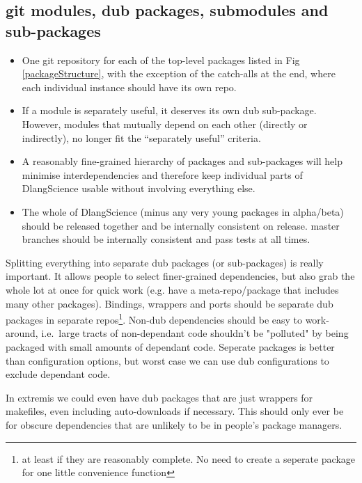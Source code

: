 \documentclass[10pt,a5paper,DIV=13]{scrartcl}
\begin{document}
\subsection{git modules, dub packages, submodules and sub-packages}
\begin{itemize}
    \item One git repository for each of the top-level packages listed in Fig \ref{packageStructure}, with the exception of the catch-alls at the end, where each individual instance should have its own repo.
    \item If a module is separately useful, it deserves its own dub sub-package. However, modules that mutually depend on each other (directly or indirectly), no longer fit the ``separately useful'' criteria.
    \item A reasonably fine-grained hierarchy of packages and sub-packages will help minimise interdependencies and therefore keep individual parts of DlangScience usable without involving everything else.
    \item The whole of DlangScience (minus any very young packages in alpha/beta) should be released together and be internally consistent on release. master branches should be internally consistent and pass tests at all times.
\end{itemize}

Splitting everything into separate dub packages (or sub-packages) is really important. It allows people to select finer-grained dependencies, but also grab the whole lot at once for quick work (e.g. have a meta-repo/package that includes many other packages). Bindings, wrappers and ports should be separate dub packages in separate repos\footnote{at least if they are reasonably complete. No need to create a seperate package for one little convenience function}. Non-dub dependencies should be easy to work-around, i.e.\ large tracts of non-dependant code shouldn't be "polluted" by being packaged with small amounts of dependant code. Seperate packages is better than configuration options, but worst case we can use dub configurations to exclude dependant code.

In extremis we could even have dub packages that are just wrappers for makefiles, even including auto-downloads if necessary. This should only ever be for obscure dependencies that are unlikely to be in people's package managers.
\end{document}
